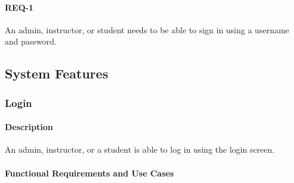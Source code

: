 \documentclass{article}
\begin{document}
\paragraph{REQ-1} An admin, instructor, or student needs to be able to sign in using a username and password.

\subsection{System Features}







\subsubsection{Login}




\paragraph{Description} An admin, instructor, or a student is able to log in using the login screen.

\paragraph{Functional Requirements and Use Cases}
\end{document}
